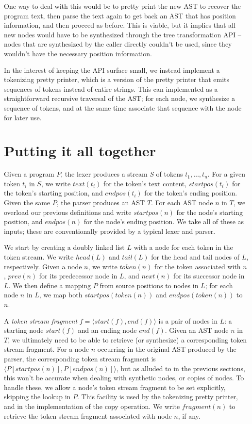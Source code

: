 One way to deal with this would be to pretty print the new AST to recover the
program text, then parse the text again to get back an AST that has position
information, and then proceed as before. This is viable, but it implies that
all new nodes would have to be synthesized through the tree transformation API
-- nodes that are synthesized by the caller directly couldn't be used, since
they wouldn't have the necessary position information.

In the interest of keeping the API surface small, we instead implement a
tokenizing pretty printer, which is a version of the pretty printer that emits
sequences of tokens instead of entire strings. This can implemented as a
straightforward recursive traversal of the AST; for each node, we synthesize a
sequence of tokens, and at the same time associate that sequence with the node
for later use.

\section{Putting it all together}

Given a program $P$, the lexer produces a stream $S$ of tokens $t_1, \dots,
t_n$. For a given token $t_i$ in $S$, we write $text(t_i)$ for the token's text
content, $startpos(t_i)$ for the token's starting position, and $endpos(t_i)$
for the token's ending position. Given the same $P$, the parser produces an AST
$T$. For each AST node $n$ in $T$, we overload our previous definitions and
write $startpos(n)$ for the node's starting position, and $endpos(n)$ for the
node's ending position. We take all of these as inputs; these are
conventionally provided by a typical lexer and parser.

We start by creating a doubly linked list $L$ with a node for each token in the
token stream. We write $head(L)$ and $tail(L)$ for the head and tail nodes of
$L$, respectively. Given a node $n$, we write $token(n)$ for the token
associated with $n$, $prev(n)$ for its predecessor node in $L$, and $next(n)$
for its successor node in $L$. We then define a mapping $P$ from source
positions to nodes in $L$; for each node $n$ in $L$, we map both
$startpos(token(n))$ and $endpos(token(n))$ to $n$.

A \emph{token stream fragment} $f = \langle start(f), end(f) \rangle$ is a pair
of nodes in $L$: a starting node $start(f)$ and an ending node $end(f)$. Given
an AST node $n$ in $T$, we ultimately need to be able to retrieve (or
synthesize) a corresponding token stream fragment. For a node $n$ occurring in
the original AST produced by the parser, the corresponding token stream
fragment is $\langle P[startpos(n)], P[endpos(n)] \rangle$, but as alluded to
in the previous sections, this won't be accurate when dealing with synthetic
nodes, or copies of nodes. To handle these, we allow a node's token stream
fragment to be set explicitly, skipping the lookup in $P$. This facility is
used by the tokenizing pretty printer, and in the implementation of the copy
operation. We write $fragment(n)$ to retrieve the token stream fragment
associated with node $n$, if any.

